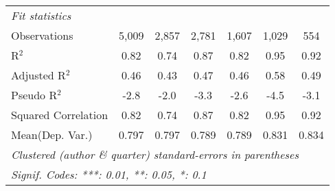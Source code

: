 \begin{tabular}{lcccccc}
   \midrule
   \emph{Fit statistics}\\
   Observations                                               & 5,009          & 2,857         & 2,781        & 1,607       & 1,029        & 554\\  
   R$^2$                                                      & 0.82           & 0.74          & 0.87         & 0.82        & 0.95         & 0.92\\  
   Adjusted R$^2$                                             & 0.46           & 0.43          & 0.47         & 0.46        & 0.58         & 0.49\\  
   Pseudo R$^2$                                               & -2.8           & -2.0          & -3.3         & -2.6        & -4.5         & -3.1\\  
   Squared Correlation                                        & 0.82           & 0.74          & 0.87         & 0.82        & 0.95         & 0.92\\  
Mean(Dep. Var.) & 0.797 & 0.797 & 0.789 & 0.789 & 0.831 & 0.834 \\
   \midrule \midrule
   \multicolumn{7}{l}{\emph{Clustered (author \& quarter) standard-errors in parentheses}}\\
   \multicolumn{7}{l}{\emph{Signif. Codes: ***: 0.01, **: 0.05, *: 0.1}}\\
\end{tabular}
\par\endgroup
